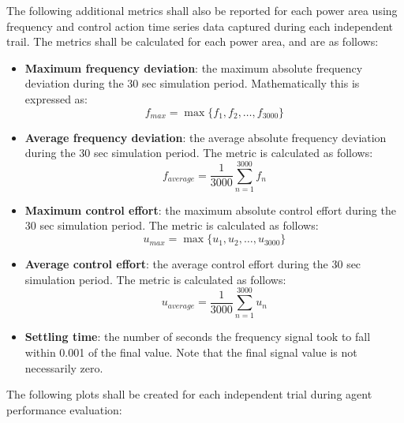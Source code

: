 The following additional metrics shall also be reported for each power area using frequency and control action time series data captured during each independent trail. The metrics shall be calculated for each power area, and are as follows:
\begin{itemize}
	\item \textbf{Maximum frequency deviation}: the maximum absolute frequency deviation during the 30 sec simulation period. Mathematically this is expressed as:\\
		\begin{equation}
			f_{max} = \max \big\{ f_1, f_2, \dotsc, f_{3000} \big\}
		\end{equation}
	
	\item \textbf{Average frequency deviation}: the average absolute frequency deviation during the 30 sec simulation period. The metric is calculated as follows:\\
		\begin{equation}
			f_{average} = \frac{1}{3000}\sum_{n=1}^{3000} f_n
		\end{equation}
		
	\item \textbf{Maximum control effort}: the maximum absolute control effort during the 30 sec simulation period. The metric is calculated as follows:\\
		\begin{equation}
			u_{max} = \max \big\{ u_1, u_2, \dotsc, u_{3000} \big\}
		\end{equation}
		
	\item \textbf{Average control effort}: the average control effort during the 30 sec simulation period. The metric is calculated as follows:\\
		\begin{equation}
			u_{average} = \frac{1}{3000}\sum_{n=1}^{3000} u_n
		\end{equation}
		
	\item \textbf{Settling time}: the number of seconds the frequency signal took to fall within 0.001 of the final value. Note that the final signal value is not necessarily zero.
\end{itemize}

The following plots shall be created for each independent trial during agent performance evaluation:

